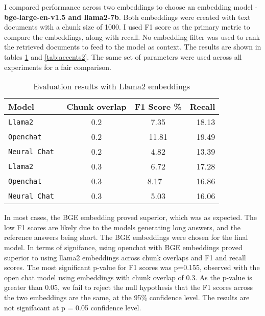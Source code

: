 \documentclass[11pt]{article}
\begin{document}
I compared performance across two embeddings to choose an embedding model - \textbf{bge-large-en-v1.5 and llama2-7b}. Both embeddings were created with text documents with a chunk size of 1000. I used F1 score as the primary metric to compare the embeddings, along with recall. No embedding filter was used to rank the retrieved documents to feed to the model as context. The results are shown in tables \ref{tab:accents} and \ref{tab:accents2}. 
The same set of parameters were used across all experiments for a fair comparison.
\begin{table}
\centering
  \begin{tabular}{ l c c r }
  \hline
    \textbf{Model} & \textbf{Chunk overlap} & \textbf{F1 Score \%} & \textbf{Recall}\\
    \hline
    \verb|Llama2 | & 0.2   &  {7.35} & {18.13} \\
    \verb|Openchat | &  0.2 & {11.81}  & {19.49}\\ 
    \verb|Neural Chat | & 0.2  & {4.82}  & {13.39}\\ 
    \verb|Llama2 | &  0.3 &  {6.72}  & {17.28}\\
    \verb|Openchat | &  0.3 & {8.17} \ & {16.86} \\ 
    \verb|Neural Chat | & 0.3 & {5.03}  & {16.06}\\ 
    \hline
  \end{tabular}
\caption{Evaluation results with Llama2 embeddings}
\label{tab:accents}
\end{table}

  In most cases, the BGE embedding proved superior, which was as expected. The low F1 scores are likely due to the models generating long answers, and the reference answers being short. The BGE embeddings were chosen for the final model.
  In terms of signifance, using openchat with BGE embeddings proved superior to using llama2 embeddings across chunk overlaps and F1 and recall scores.
  The most significant p-value for F1 scores was p=0.155, observed with the open chat model using embeddings with chunk overlap of 0.3.
  As the p-value is greater than 0.05, we fail to reject the null hypothesis that the F1 scores across the two embeddings are the same, at the 95\% confidence level.
  The results are not signifacant at p = 0.05 confidence level.
\end{document}
